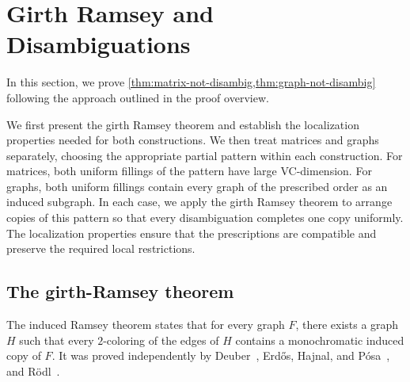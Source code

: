 \documentclass[11pt]{article}
\DeclareMathOperator{\diam}{diam}
\theoremstyle{remark}
\begin{document}

\section{Girth Ramsey and Disambiguations}

In this section, we prove
\cref{thm:matrix-not-disambig,thm:graph-not-disambig} following the approach outlined in the proof overview.

We first present the girth Ramsey theorem and establish the localization properties needed for both constructions.
We then treat matrices and graphs separately, choosing the appropriate partial pattern within each construction.
For matrices, both uniform fillings of the pattern have large VC-dimension.
For graphs, both uniform fillings contain every graph of the prescribed order as an induced subgraph.
In each case, we apply the girth Ramsey theorem to arrange copies of this pattern so that every disambiguation completes one copy uniformly.
The localization properties ensure that the prescriptions are compatible and preserve the required local restrictions.

\subsection{The girth-Ramsey theorem}

The induced Ramsey theorem states that for every graph $F$, there exists a graph $H$ such that every $2$-coloring of the edges of $H$ contains a monochromatic induced copy of $F$.
It was proved independently by Deuber~\cite{Deuber75}, Erd\H{o}s, Hajnal, and P\'osa~\cite{EHP75}, and R\"odl~\cite{Rodl73}.
\end{document}
